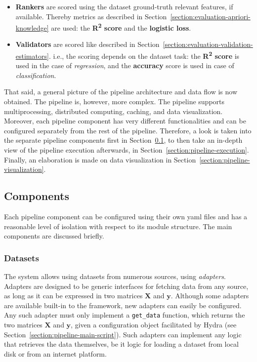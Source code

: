 \documentclass[../main.tex]{subfiles}
\begin{document}
\begin{itemize}
    \item \textbf{Rankers} are scored using the dataset ground-truth relevant features, if available. Thereby metrics as described in Section~\ref{section:evaluation-apriori-knowledge} are used: the \textbf{R\textsuperscript{2} score} and the \textbf{logistic loss}.
    \item \textbf{Validators} are scored like described in Section~\ref{section:evaluation-validation-estimators}. i.e., the scoring depends on the dataset task: the \textbf{R\textsuperscript{2} score} is used in the case of \textit{regression}, and the \textbf{accuracy} score is used in case of \textit{classification}.
\end{itemize}

That said, a general picture of the pipeline architecture and data flow is now obtained. The pipeline is, however, more complex. The pipeline supports multiprocessing, distributed computing, caching, and data visualization. Moreover, each pipeline component has very different functionalities and can be configured separately from the rest of the pipeline. Therefore, a look is taken into the separate pipeline components first in Section~\ref{section:pipeline-components}, to then take an in-depth view of the pipeline execution afterwards, in Section~\ref{section:pipeline-execution}. Finally, an elaboration is made on data visualization in Section~\ref{section:pipeline-visualization}.







\subsection{Components}\label{section:pipeline-components}
Each pipeline component can be configured using their own yaml files and has a reasonable level of isolation with respect to its module structure. The main components are discussed briefly.



\subsubsection{Datasets}\label{section:pipeline-components-datasets}
The system allows using datasets from numerous sources, using \textit{adapters}. Adapters are designed to be generic interfaces for fetching data from any source, as long as it can be expressed in two matrices $\mathbf{X}$ and $\mathbf{y}$. Although some adapters are available built-in to the framework, new adapters can easily be configured. Any such adapter must only implement a \texttt{get\_data} function, which returns the two matrices $\mathbf{X}$ and $\mathbf{y}$, given a configuration object facilitated by Hydra (see Section~\ref{section:pipeline-main-script}). Such adapters can implement any logic that retrieves the data themselves, be it logic for loading a dataset from local disk or from an internet platform.
\end{document}
